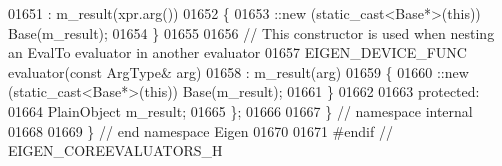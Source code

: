 \begin{DoxyCode}
01651     : m\_result(xpr.arg())
01652   \{
01653     ::new (static\_cast<Base*>(\textcolor{keyword}{this})) Base(m\_result);
01654   \}
01655 
01656   \textcolor{comment}{// This constructor is used when nesting an EvalTo evaluator in another evaluator}
01657   EIGEN\_DEVICE\_FUNC evaluator(const ArgType& arg)
01658     : m\_result(arg)
01659   \{
01660     ::new (static\_cast<Base*>(\textcolor{keyword}{this})) Base(m\_result);
01661   \}
01662 
01663 protected:
01664   PlainObject m\_result;
01665 \};
01666 
01667 \} \textcolor{comment}{// namespace internal}
01668 
01669 \} \textcolor{comment}{// end namespace Eigen}
01670 
01671 \textcolor{preprocessor}{#endif // EIGEN\_COREEVALUATORS\_H}
\end{DoxyCode}
